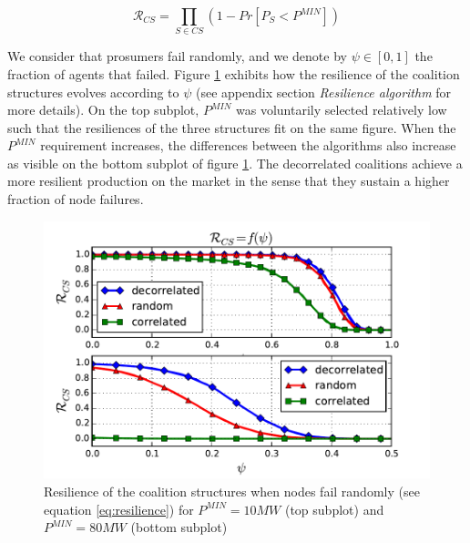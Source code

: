 \documentclass[journal]{IEEEtran}
\begin{document}
\begin{equation}
\mathcal{R}_{CS} = \prod_{S \in CS} \left( 1 - Pr[ P_{S} < P^{MIN} ] \right)
\label{eq:resilience}
\end{equation}

We consider that prosumers fail randomly, and we denote by $ \psi \in [0,1] $ the fraction of agents that failed. Figure \ref{fig:resilience} exhibits how the resilience of the coalition structures evolves according to $ \psi $ (see appendix section \textit{Resilience algorithm} for more details). On the top subplot, $ P^{MIN} $ was voluntarily selected relatively low such that the resiliences of the three structures fit on the same figure. When the $ P^{MIN} $ requirement increases, the differences between the algorithms also increase as visible on the bottom subplot of figure \ref{fig:resilience}. The decorrelated coalitions achieve a more resilient production on the market in the sense that they sustain a higher fraction of node failures.

\begin{figure}
	\begin{center}
		\includegraphics[scale=.45]{./figs/figure_6}
		\caption{{\footnotesize Resilience of the coalition structures when nodes fail randomly (see equation \ref{eq:resilience}) for $ P^{MIN} = 10MW $ (top subplot) and $ P^{MIN} = 80MW $ (bottom subplot)} }
		\label{fig:resilience}
	\end{center}
\end{figure}

%
%
\end{document}
